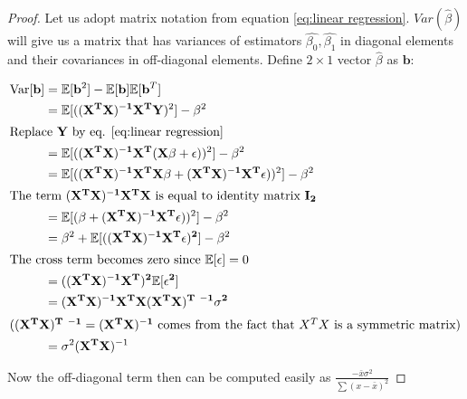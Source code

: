 \documentclass[12pt,a4paper,oneside]{book} %
\newcommand{\E}{\mathbb{E}}
\newcommand{\Var}{\mathrm{Var}}
\begin{document}
\begin{proof}
	Let us adopt matrix notation from equation \ref{eq:linear regression}.
	$Var(\hat{\beta})$ will give us a matrix that has variances of estimators $\hat{\beta_0}, \hat{\beta_1}$ in diagonal elements and their covariances in off-diagonal elements. Define $2 \times 1$ vector $\hat{\beta}$ as $\mathbf{b}$:
	
	\begin{align*}
		\Var [\mathbf{b}] &= \E [\mathbf{b}^2] - \E [\mathbf{b}] \E[\mathbf{b}^T] \\
		&= \E [\mathbf{((X^TX)^{-1}X^TY})^2] - \beta^2 \\
		\intertext{Replace $\mathbf{Y}$ by eq. \ref{eq:linear regression}}
		&= \E [\mathbf{((X^TX)^{-1}X^T(X
			\beta+\epsilon)})^2] - \beta^2 \\
		&= \E [\mathbf{((X^TX)^{-1}X^TX
			\beta+(X^TX)^{-1}X^T\epsilon)})^2] - \beta^2 \\
	\intertext{The term $\mathbf{(X^TX)^{-1}X^TX
	}$ is equal to identity matrix $\mathbf{I_2}$ }
		&=  \E [\mathbf{(\beta+(X^TX)^{-1}X^T\epsilon)})^2] - \beta^2 \\
		&=  \beta^2 + \mathbf{\E [((X^TX)^{-1}X^T\epsilon)^2]} - \beta^2 \\
		\intertext{The cross term becomes zero since $\E [\epsilon]=0$}
		&= \mathbf{((X^TX)^{-1}X^T)^2\E [\epsilon^2]} \\
		&= \mathbf{(X^TX)^{-1}X^TX(X^TX)^T \ ^{-1} \sigma^2} \\
		\intertext{($\mathbf{(X^TX)^T \ ^{-1}= (X^TX)^{-1}}$ comes from the fact that $X^TX$ is a symmetric matrix)}
		&= \sigma^2 (\mathbf{X^TX})^{-1}
	\end{align*}
	
	Now the off-diagonal term then can be computed easily as $\frac{-\bar{x}\sigma^2}{\sum (x-\bar{x})^2}$
	
\end{proof}
\end{document}

